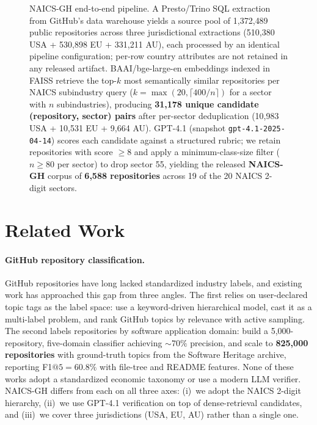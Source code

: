 \documentclass{article}
\begin{document}
\begin{figure}[ht]
{\begin{tikzpicture}
\end{tikzpicture}%
}
\caption{NAICS-GH end-to-end pipeline. A Presto/Trino SQL extraction
from GitHub's data warehouse yields a source pool of
1{,}372{,}489 public repositories across three jurisdictional
extractions (510{,}380 USA + 530{,}898 EU + 331{,}211 AU), each
processed by an identical pipeline configuration; per-row country
attributes are not retained in any released artifact.
BAAI/bge-large-en embeddings indexed in FAISS retrieve the top-$k$
most semantically similar repositories per NAICS subindustry query
($k = \max(20, \lceil 400/n \rceil)$ for a sector with $n$
subindustries), producing \textbf{31{,}178 unique candidate
(repository, sector) pairs} after per-sector deduplication
(10{,}983 USA + 10{,}531 EU + 9{,}664 AU). GPT-4.1
(snapshot \texttt{gpt-4.1-2025-04-14}) scores each candidate against a
structured rubric; we retain repositories with score $\geq 8$ and
apply a minimum-class-size filter ($n{\geq}80$ per sector) to drop
sector 55, yielding the released \textbf{NAICS-GH} corpus of
\textbf{6{,}588 repositories} across 19 of the 20 NAICS 2-digit
sectors.}
\label{fig:pipeline}
\end{figure}

\section{Related Work}
\label{sec:related}

\paragraph{GitHub repository classification.}
GitHub repositories have long lacked standardized industry labels, and
existing work has approached this gap from three angles. The first
relies on user-declared topic tags as the label space:
\citet{zhang2019higitclass} use a keyword-driven hierarchical model,
\citet{izadi2020topic} cast it as a multi-label problem, and
\citet{sas2022gitranking} rank GitHub topics by relevance with active
sampling. The second labels repositories by software application
domain: \citet{zanartu2022categorizing} build a 5{,}000-repository,
five-domain classifier achieving $\sim 70\%$ precision, and
\citet{balla2026dragon} scale to \textbf{825{,}000 repositories} with
ground-truth topics from the Software Heritage archive, reporting
F1$@5 = 60.8\%$ with file-tree and README features. None of these
works adopt a standardized economic taxonomy or use a modern LLM
verifier. NAICS-GH differs from each on all three axes:
(i)~we adopt the NAICS 2-digit hierarchy, (ii)~we use GPT-4.1
verification on top of dense-retrieval candidates, and (iii)~we
cover three jurisdictions (USA, EU, AU) rather than a single one.
\end{document}
